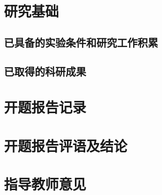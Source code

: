 \documentclass{xdupgtp}
\begin{document}
\section{研究基础}
\begin{yjjc}
\subsection{已具备的实验条件和研究工作积累}
\subsection{已取得的科研成果}
\end{yjjc}


\section{开题报告记录}
\begin{bgjl}
\end{bgjl}

\section{开题报告评语及结论}
\begin{pyjl}
\end{pyjl}

\section{指导教师意见}
\begin{jsyj}
\end{jsyj}
\begin{xnjsyj}
\end{xnjsyj}
\begin{xyjsyj}
\end{xyjsyj}
\end{document}
